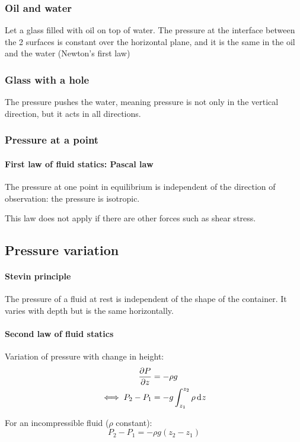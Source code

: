 \documentclass[10pt, twocolumn]{article}
\begin{document}
\subsubsection*{Oil and water}
Let a glass filled with oil on top of water.
The pressure at the interface between the 2 surfaces is constant over the horizontal plane, and it is the same in the oil and the water (Newton's first law)

\subsubsection*{Glass with a hole}
The pressure pushes the water, meaning pressure is not only in the vertical direction, but it acts in all directions.

\subsubsection*{Pressure at a point}
\paragraph{First law of fluid statics: Pascal law}
The pressure at one point in equilibrium is independent of the direction of observation: the pressure is isotropic.

This law does not apply if there are other forces such as shear stress.


\subsection{Pressure variation}
\paragraph{Stevin principle}
The pressure of a fluid at rest is independent of the shape of the container.
It varies with depth but is the same horizontally.

\paragraph{Second law of fluid statics}
Variation of pressure with change in height:
\begin{align*}
  \frac{\partial P}{\partial z} & = - \rho g                              \\
  \iff P_2 - P_1          & = -g\int_{z_1 }^{z_2 }{\rho\,\mathrm{d}^{} z}
\end{align*}

For an incompressible fluid (\(\rho\) constant):
\[
  P_2 - P_1 = -\rho g\left( z_2 - z_1 \right)
\]
\end{document}
